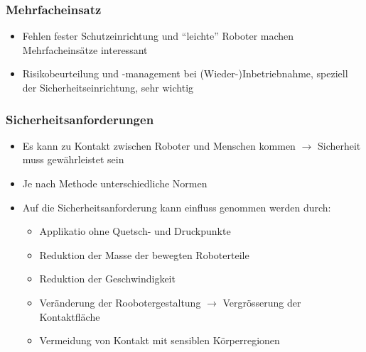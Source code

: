 \begin{minipage}{0.5\linewidth}
    \subsubsection{Mehrfacheinsatz}
    \begin{itemize}
        \item Fehlen fester Schutzeinrichtung und "`leichte"' Roboter machen Mehrfacheinsätze interessant
        \item Risikobeurteilung und -management bei (Wieder-)Inbetriebnahme, speziell der Sicherheitseinrichtung, sehr wichtig
    \end{itemize}
\end{minipage}
\subsubsection{Sicherheitsanforderungen}
\begin{itemize}
    \item Es kann zu Kontakt zwischen Roboter und Menschen kommen $\rightarrow$ Sicherheit muss gewährleistet sein
    \item Je nach Methode unterschiedliche Normen
    \item Auf die Sicherheitsanforderung kann einfluss genommen werden durch:
    \begin{itemize}
        \item Applikatio ohne Quetsch- und Druckpunkte
        \item Reduktion der Masse der bewegten Roboterteile
        \item Reduktion der Geschwindigkeit
        \item Veränderung der Roobotergestaltung $\rightarrow$ Vergrösserung der Kontaktfläche
        \item Vermeidung von Kontakt mit sensiblen Körperregionen
    \end{itemize}
\end{itemize}


